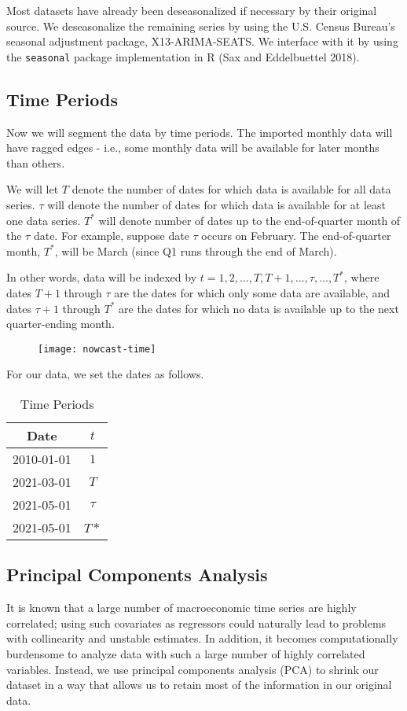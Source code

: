 \documentclass[11pt, letterpaper]{article}\usepackage[]{graphicx}\usepackage[]{color}
\begin{document}
Most datasets have already been deseasonalized if necessary by their original source. We deseasonalize the remaining series by using the U.S. Census Bureau's seasonal adjustment package, X13-ARIMA-SEATS. We interface with it by using the \texttt{seasonal} package implementation in R (Sax and Eddelbuettel 2018).

\subsection{Time Periods}
Now we will segment the data by time periods. The imported monthly data will have ragged edges - i.e., some monthly data will be available for later months than others.

We will let $T$ denote the number of dates for which data is available for all data series. $\tau$ will denote the number of dates for which data is available for at least one data series. $T^*$ will denote number of dates up to the end-of-quarter month of the $\tau$ date. For example, suppose date $\tau$ occurs on February. The end-of-quarter month, $T^*$, will be March (since Q1 runs through the end of March). 

In other words, data will be indexed by $t = 1, 2, \dots, T, T+1, \dots, \tau, \dots, T^*$, where dates $T + 1$ through $\tau$ are the dates for which only some data are available, and dates $\tau + 1$ through $T^*$ are the dates for which no data is available up to the next quarter-ending month.
\begin{figure}[H]
\texttt{[image: nowcast-time]}
\centering
\end{figure}
For our data, we set the dates as follows.
\begin{table}[H]
\centering
\begingroup\footnotesize
\begin{tabular}{cc}
  \hline
Date & $t$ \\ 
  \hline
2010-01-01 & $1$ \\ 
  2021-03-01 & $T$ \\ 
  2021-05-01 & $\tau$ \\ 
  2021-05-01 & $T*$ \\ 
   \hline
\end{tabular}
\endgroup
\caption{Time Periods} 
\end{table}


\subsection{Principal Components Analysis}
It is known that a large number of macroeconomic time series are highly correlated; using such covariates as regressors could naturally lead to problems with collinearity and unstable estimates. In addition, it becomes computationally burdensome to analyze data with such a large number of highly correlated variables. Instead, we use principal components analysis (PCA) to shrink our dataset in a way that allows us to retain most of the information in our original data.
\end{document}
